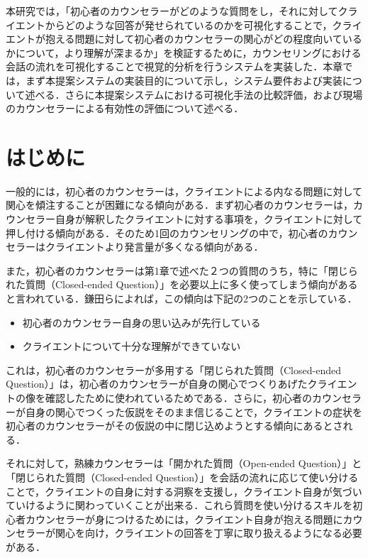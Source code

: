 \documentclass[shuuron]{kuee}
\begin{document}
本研究では，「初心者のカウンセラーがどのような質問をし，それに対してクライエントからどのような回答が発せられているのかを可視化することで，クライエントが抱える問題に対して初心者のカウンセラーの関心がどの程度向いているかについて，より理解が深まるか」を検証するために，カウンセリングにおける会話の流れを可視化することで視覚的分析を行うシステムを実装した．本章では，まず本提案システムの実装目的について示し，システム要件および実装について述べる．さらに本提案システムにおける可視化手法の比較評価，および現場のカウンセラーによる有効性の評価について述べる．

\section{はじめに}%





一般的には，初心者のカウンセラーは，クライエントによる内なる問題に対して関心を傾注することが困難になる傾向がある．まず初心者のカウンセラーは，カウンセラー自身が解釈したクライエントに対する事項を，クライエントに対して押し付ける傾向がある．そのため1回のカウンセリングの中で，初心者のカウンセラーはクライエントより発言量が多くなる傾向がある．

また，初心者のカウンセラーは第1章で述べた２つの質問のうち，特に「閉じられた質問（Closed-ended Question）」を必要以上に多く使ってしまう傾向があると言われている．鎌田ら\cite{Darshana}によれば，この傾向は下記の2つのことを示している．
\begin{itemize}
  \item 初心者のカウンセラー自身の思い込みが先行している
  \item クライエントについて十分な理解ができていない
\end{itemize}


これは，初心者のカウンセラーが多用する「閉じられた質問（Closed-ended Question）」は，初心者のカウンセラーが自身の関心でつくりあげたクライエントの像を確認したために使われているためである．さらに，初心者のカウンセラーが自身の関心でつくった仮説をそのまま信じることで，クライエントの症状を初心者のカウンセラーがその仮説の中に閉じ込めようとする傾向にあるとされる．

それに対して，熟練カウンセラーは「開かれた質問（Open-ended Question）」と「閉じられた質問（Closed-ended Question）」を会話の流れに応じて使い分けることで，クライエントの自身に対する洞察を支援し，クライエント自身が気づいていけるように関わっていくことが出来る．これら質問を使い分けるスキルを初心者カウンセラーが身につけるためには，クライエント自身が抱える問題にカウンセラーが関心を向け，クライエントの回答を丁寧に取り扱えるようになる必要がある．
\end{document}
